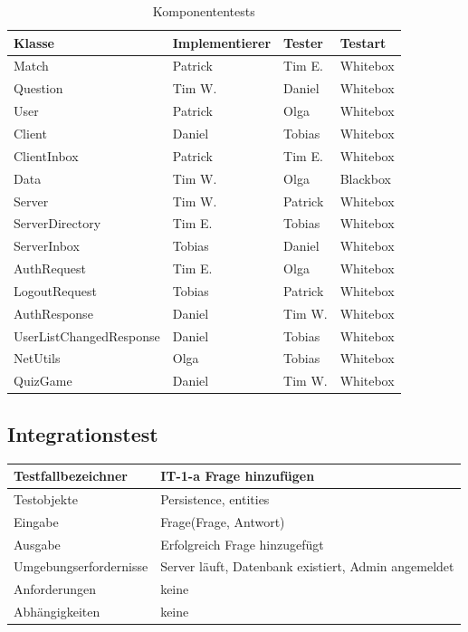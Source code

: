 \documentclass[fontsize=12pt,paper=a4,twoside]{scrartcl}
\begin{document}
\begin{table}[h]
\centering
\begin{tabular}{|l|p{3cm}|p{3cm}|l|}
\hline
Klasse & Implementierer & Tester & Testart \\
\hline
Match & Patrick  & Tim E.   & Whitebox \\
Question      & Tim W.   & Daniel   & Whitebox \\
User     & Patrick  & Olga   & Whitebox \\
Client      & Daniel  & Tobias    & Whitebox \\
ClientInbox      & Patrick  & Tim E.   & Whitebox \\
Data      & Tim W.  & Olga    & Blackbox \\
Server      & Tim W. & Patrick    & Whitebox \\
ServerDirectory      & Tim E. & Tobias    & Whitebox \\
ServerInbox      & Tobias & Daniel    & Whitebox \\
AuthRequest      & Tim E. & Olga    & Whitebox \\
LogoutRequest      & Tobias  & Patrick    & Whitebox \\
AuthResponse      & Daniel  & Tim W.   & Whitebox \\
UserListChangedResponse      & Daniel  & Tobias    & Whitebox \\
NetUtils      & Olga  & Tobias    & Whitebox \\
QuizGame      & Daniel  & Tim W.   & Whitebox \\
\hline
\end{tabular}
\caption{Komponententests}
\end{table}

\clearpage
\subsection{Integrationstest}\label{c10a}

\begin{tabular}{|l|p{12cm}|}
\hline
	Testfallbezeichner & IT-1-a Frage hinzufügen\\
\hline
	Testobjekte & Persistence, entities\\
\hline
	Eingabe & Frage(Frage, Antwort)\\
\hline
	Ausgabe & Erfolgreich Frage hinzugefügt\\
\hline
	Umgebungserfordernisse & Server läuft, Datenbank existiert, Admin angemeldet\\
\hline
	Anforderungen & keine\\
\hline
	Abhängigkeiten & keine \\
\hline
\end{tabular}
\end{document}
